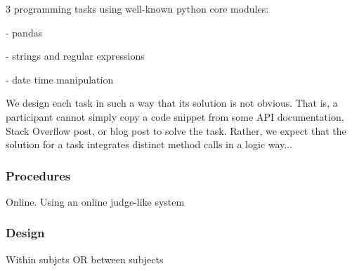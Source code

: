 3 programming tasks using well-known python core modules:

- pandas

- strings and regular expressions

- date time manipulation


We design each task in such a way that its solution is not obvious. 
That is, a participant cannot simply copy a code snippet from some API documentation, Stack Overflow post, or blog post to solve the task. Rather, we expect 
that the solution for a task integrates distinct method calls in a logic way...


\subsubsection{Procedures}


Online. Using an online judge-like system


\subsubsection{Design}


Within subjcts OR between subjects











